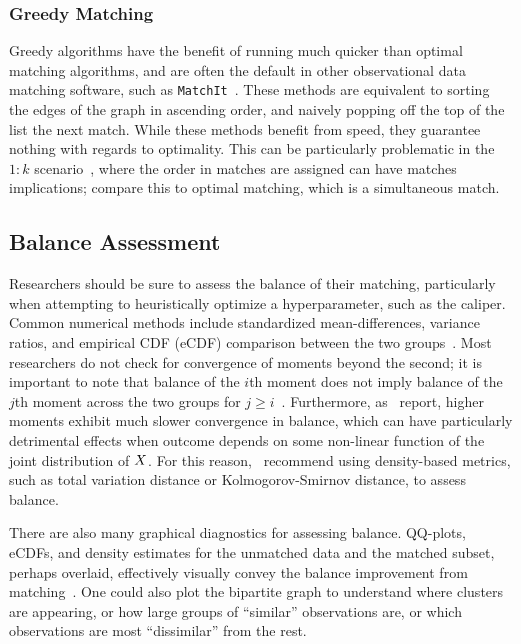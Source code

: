 \documentclass[11pt]{extarticle}
\begin{document}
\subsubsection{Greedy Matching}

Greedy algorithms have the benefit of running much quicker than optimal matching algorithms, and are often the default in other observational data matching software, such as \texttt{MatchIt}~\parencite{ho_matchit_2011}. These methods are equivalent to sorting the edges of the graph in ascending order, and naively popping off the top of the list the next match. While these methods benefit from speed, they guarantee nothing with regards to optimality. This can be particularly problematic in the $1:k$ scenario~\parencite{rosenbaum_optimal_1989}, where the order in matches are assigned can have matches implications; compare this to optimal matching, which is a simultaneous match.

\subsection{Balance Assessment}

Researchers should be sure to assess the balance of their matching, particularly when attempting to heuristically optimize a hyperparameter, such as the caliper.
Common numerical methods include standardized mean-differences, variance ratios, and empirical CDF (eCDF) comparison between the two groups~\parencite{greifer_assessing_2022}.
Most researchers do not check for convergence of moments beyond the second; it is important to note that balance of the $i$th moment does not imply balance of the $j$th moment across the two groups for $j \geq i$~\parencite{garrido_methods_2014}.
Furthermore, as~\textcite{basu_use_2008} report, higher moments exhibit much slower convergence in balance, which can have particularly detrimental effects when outcome depends on some non-linear function of the joint distribution of $X$.
For this reason,~\textcite{zhu_kernel-based_2018} recommend using density-based metrics, such as total variation distance or Kolmogorov-Smirnov distance, to assess balance.

There are also many graphical diagnostics for assessing balance. QQ-plots, eCDFs, and density estimates for the unmatched data and the matched subset, perhaps overlaid, effectively visually convey the balance improvement from matching~\parencite{greifer_assessing_2022}. One could also plot the bipartite graph to understand where clusters are appearing, or how large groups of ``similar'' observations are, or which observations are most ``dissimilar'' from the rest.
\end{document}
